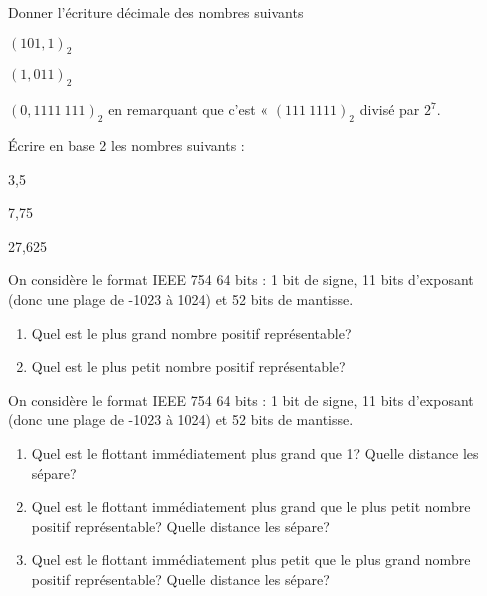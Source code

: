 \begin{exercice}[]
    Donner l'écriture décimale des nombres suivants\begin{enumalph}
        \item 	$(101,1)_2$
        \item 	$(1,011)_2$
        \item 	$(0,1111\ 111)_2$ en remarquant que c'est « $(111\ 1111)_2$ divisé par $2^7$.
    \end{enumalph}
\end{exercice}
\begin{exercice}[]
    \'Ecrire en base 2 les nombres suivants :
    \begin{enumalph}
        \item 	3,5
        \item 	7,75
        \item 	27,625
    \end{enumalph}
\end{exercice}

\begin{exercice}
    On considère le format IEEE 754 64 bits : 1 bit de signe, 11 bits d'exposant (donc une plage de -1023 à 1024) et 52 bits de
    mantisse.
    \begin{enumerate}
        \item 	Quel est le plus grand nombre positif représentable?
        \item 	Quel est le plus petit nombre positif représentable?
    \end{enumerate}
\end{exercice}

\begin{exercice}
    On considère le format IEEE 754 64 bits : 1 bit de signe, 11 bits d'exposant (donc une plage de -1023 à 1024) et 52 bits de
    mantisse.
    \begin{enumerate}
        \item 	Quel est le flottant immédiatement plus grand que 1? Quelle distance les sépare?
        \item 	Quel est le flottant immédiatement plus grand que le plus petit nombre positif représentable? Quelle distance les sépare?
        \item 	Quel est le flottant immédiatement plus petit que le plus grand nombre positif représentable? Quelle distance les sépare?
    \end{enumerate}
\end{exercice}

